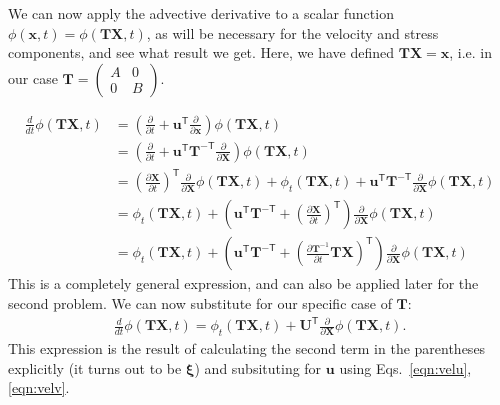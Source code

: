 \documentclass[11pt]{article}
\newcommand{\p}{\partial}
\newcommand{\bxi}{\boldsymbol\xi}
\newcommand{\bT}{\mathbf{T}}
\newcommand{\bU}{\mathbf{U}}
\newcommand{\bX}{\mathbf{X}}
\newcommand{\bx}{\mathbf{x}}
\newcommand{\bu}{\mathbf{u}}
\newcommand{\Trans}{\mathsf{T}}
\begin{document}
We can now apply the advective derivative to a scalar function $\phi(\bx, t) = \phi(\bT\bX, t)$, as will be necessary for the velocity and stress components, and see what result we get. Here, we have defined $\bT\bX = \bx$, i.e. in our case $\bT = \begin{pmatrix} A & 0 \\ 0 & B\end{pmatrix}$.

\begin{align}
    \frac{d}{dt}\phi(\bT\bX, t) &= \left(\frac{\p}{\p t} + \bu^\Trans\frac{\p}{\p \bx}\right)\phi(\bT\bX,t)\nonumber\\
    &= \left( \frac{\p}{\p t} + \bu^\Trans\bT^{-\Trans}\frac{\p}{\p \bX}\right)\phi(\bT\bX, t)\nonumber\\
&= \left(\frac{\p \bX}{\p t}\right)^\Trans\frac{\p}{\p \bX}\phi(\bT\bX, t) + \phi_t(\bT\bX, t) + \bu^\Trans\bT^{-\Trans}\frac{\p}{\p\bX}\phi(\bT\bX, t)\nonumber\\
    &= \phi_t(\bT\bX, t) + \left(\bu^\Trans\bT^{-\Trans} + \left(\frac{\p\bX}{\p t}\right)^\Trans\right)\frac{\p}{\p \bX}\phi(\bT\bX, t)\nonumber\\
    &= \phi_t(\bT\bX, t) + \left(\bu^\Trans\bT^{-\Trans} + \left(\frac{\p\bT^{-1}}{\p t}\bT{\bX}\right)^\Trans\right)\frac{\p}{\p \bX}\phi(\bT\bX, t)
    \label{eqn:d/dt_phi_AX}
\end{align}
This is a completely general expression, and can also be applied later for the second problem. We can now substitute for our specific case of $\bT$:
\begin{align}
    \frac{d}{dt}\phi(\bT\bX, t) = \phi_t(\bT\bX, t) + \bU^\Trans \frac{\p}{\p \bX}\phi(\bT\bX, t).
    \label{eqn:adv_deriv}
\end{align}
This expression is the result of calculating the second term in the parentheses explicitly (it turns out to be $\bxi$) and subsituting for $\bu$ using Eqs.~\ref{eqn:velu}, \ref{eqn:velv}.
\end{document}

